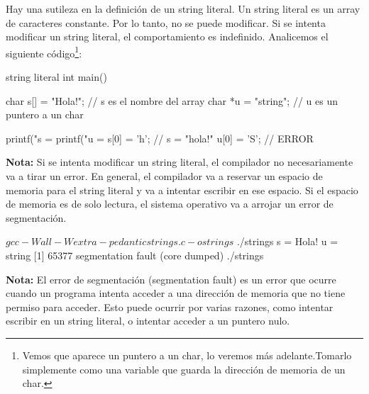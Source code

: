 \documentclass[]{scrartcl}
\begin{document}
Hay una sutileza en la definición de un string literal. Un string literal es un array de caracteres constante. Por lo tanto, no se puede modificar. Si se intenta modificar un string literal, el comportamiento es indefinido. Analicemos el siguiente código\footnote{Vemos que aparece un puntero a un char, lo veremos más adelante.Tomarlo simplemente como una variable que guarda la dirección de memoria de un char.}:

\begin{cbox}[]{string literal}
  int main(){
    char s[] = "Hola!"; // s es el nombre del array
    char *u = "string"; // u es un puntero a un char
    
    printf("s = %
    printf("u = %
    s[0] = 'h'; // s = "hola!"
    u[0] = 'S'; // ERROR
  }
\end{cbox}

\begin{notebox}
  \textbf{Nota:} Si se intenta modificar un string literal, el compilador no necesariamente va a tirar un error. En general, el compilador va a reservar un espacio de memoria para el string literal y va a intentar escribir en ese espacio. Si el espacio de memoria es de solo lectura, el sistema operativo va a arrojar un error de segmentación.
\end{notebox}

\begin{bashbox}
$ gcc -Wall -Wextra -pedantic strings.c -o strings
$ ./strings
s = Hola!
u = string
[1] 65377 segmentation fault (core dumped) ./strings  
\end{bashbox}

\begin{notebox}
  \textbf{Nota:} El error de segmentación (segmentation fault) es un error que ocurre cuando un programa intenta acceder a una dirección de memoria que no tiene permiso para acceder. Esto puede ocurrir por varias razones, como intentar escribir en un string literal, o intentar acceder a un puntero nulo.
\end{notebox}

\end{document}
